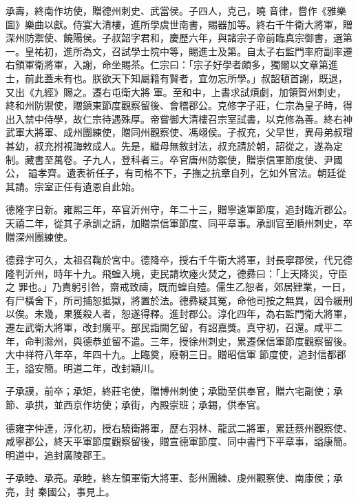 \begin{pinyinscope}
 承壽，終南作坊使，贈德州刺史、武當侯。子四人，克己，曉
 音律，嘗作《雅樂圖》樂曲以獻。侍宴大清樓，進所學虞世南書，賜器加等。終右千牛衛大將軍，贈深州防禦使、饒陽侯。子叔韶字君和，慶歷六年，與諸宗子帝前臨真宗御書，選第一。皇祐初，進所為文，召試學士院中等，賜進士及第。自太子右監門率府副率遷右領軍衛將軍，入謝，命坐賜茶。仁宗曰：「宗子好學者頗多，獨爾以文章第進士，前此蓋未有也。朕欲天下知屬籍有賢者，宜勿忘所學。」叔韶頓首謝，既退，又出《九經》賜之。遷右屯衛大將
 軍。至和中，上書求試煩劇，加領賀州刺史，終和州防禦使，贈鎮東節度觀察留後、會稽郡公。克修字子莊，仁宗為皇子時，得出入禁中侍學，故仁宗待遇殊厚。帝嘗御大清樓召宗室試書，以克修為善。終右神武軍大將軍、成州團練使，贈同州觀察使、馮翊侯。子叔充，父早世，異母弟叔瑁甚幼，叔充拊視誨敕成人。先是，繼母無敘封法，叔充請於朝，詔從之，遂為定制。藏書至萬卷。子九人，登科者三。卒官唐州防禦使，贈崇信軍節度使、尹國公，
 謚孝齊。遺表祈任子，有司格不下，子撫之抗章自列，乞如外官法。朝廷從其請。宗室正任有遺恩自此始。



 德隆字日新。雍熙三年，卒官沂州守，年二十三，贈寧遠軍節度，追封臨沂郡公。天禧二年，從其子承訓之請，加贈崇信軍節度、同平章事。承訓官至順州刺史，卒贈深州團練使。



 德彞字可久，太祖召鞠於宮中。德降卒，授右千牛衛大將軍，封長寧郡侯，代兄德隆判沂州，時年十九。飛蝗入境，吏民請坎瘞火焚之，德彞曰：「上天降災，守臣之
 罪也。」乃責躬引咎，齋戒致禱，既而蝗自殪。儒生乙恕者，郊居肄業，一日，有尸橫舍下，所司捕恕抵獄，將置於法。德彞疑其冤，命他司按之無異，因令緩刑以俟。未幾，果獲殺人者，恕遂得釋。進封郡公。淳化四年，為右監門衛大將軍，遷左武衛大將軍，改封廣平。部民詣闕乞留，有詔嘉獎。真守初，召還。咸平二年，命判滁州，與德恭並留不遣。三年，授徐州刺史，累遷保信軍節度觀察留後。大中祥符八年卒，年四十九。上臨奠，廢朝三日。贈昭信軍
 節度使，追封信都郡王，謚安簡。明道二年，改封穎川。



 子承謨，前卒；承矩，終莊宅使，贈博州刺使；承勖至供奉官，贈六宅副使；承節、承拱，並西京作坊使；承街，內殿崇班；承錫，供奉官。



 德雍字仲達，淳化初，授右驍衛將軍，歷右羽林、龍武二將軍，累廷蔡州觀察使、咸寧郡公，終天平軍節度觀察留後，贈宣德軍節度、同中書門下平章事，謚康簡。明道中，追封廣陵郡王。



 子承睦、承亮。承睦，終左領軍衛大將軍、彭州團練、虔州觀察使、南康侯；承亮，封
 秦國公，事見上。




\end{pinyinscope}
